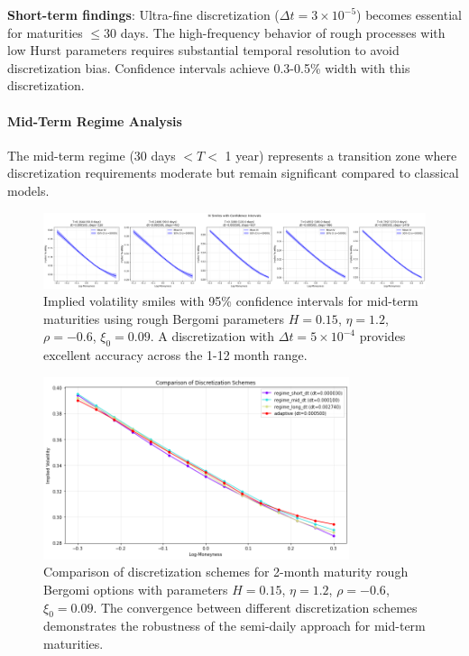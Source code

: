 	\textbf{Short-term findings}: Ultra-fine discretization ($\Delta t = 3 \times 10^{-5}$) becomes essential for maturities $\leq 30$ days. The high-frequency behavior of rough processes with low Hurst parameters requires substantial temporal resolution to avoid discretization bias. Confidence intervals achieve 0.3-0.5\% width with this discretization.
	
	\paragraph{Mid-Term Regime Analysis}
	
	The mid-term regime (30 days $< T <$ 1 year) represents a transition zone where discretization requirements moderate but remain significant compared to classical models.
	
	\begin{figure}[ht]
		\centering
		\includegraphics[width=\textwidth]{../images/mid_regime_discretization_confidence.png}
		\caption{Implied volatility smiles with 95\% confidence intervals for mid-term maturities using rough Bergomi parameters $H = 0.15$, $\eta = 1.2$, $\rho = -0.6$, $\xi_0 = 0.09$. A discretization with $\Delta t = 5\times 10^{-4}$ provides excellent accuracy across the 1-12 month range.}
		\label{fig:discretization-mid}
	\end{figure}
	
	\begin{figure}[ht]
		\centering
		\includegraphics[width=0.8\textwidth]{../images/mid_regime_discretization_schemes.png}
		\caption{Comparison of discretization schemes for 2-month maturity rough Bergomi options with parameters $H = 0.15$, $\eta = 1.2$, $\rho = -0.6$, $\xi_0 = 0.09$. The convergence between different discretization schemes demonstrates the robustness of the semi-daily approach for mid-term maturities.}
		\label{fig:discretization-schemes-mid}
	\end{figure}
	
